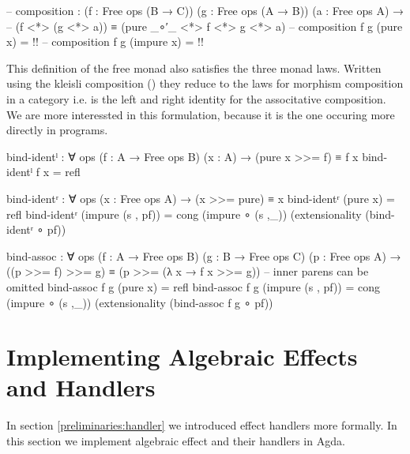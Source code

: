 \begin{code}[hide]
-- composition : (f : Free ops (B → C)) (g : Free ops (A → B)) (a : Free ops A) →
--    (f <*> (g <*> a)) ≡ (pure _∘′_ <*> f <*> g <*> a)
-- composition f g (pure x) = {!!}
-- composition f g (impure x) = {!!}
\end{code}
This definition of the free monad also satisfies the three monad laws.
Written using the kleisli composition (\AgdaFunction{>=>}) they reduce to the
laws for morphism composition in a category i.e.
 is the left and right identity for the
associtative composition.
We are more interessted in this formulation, because it is the one occuring more
directly in programs.

\begin{code}[number=bind-ident-left]
bind-identˡ : ∀ {ops} (f : A → Free ops B) (x : A) → (pure x >>= f) ≡ f x
bind-identˡ f x = refl
\end{code}
\begin{code}[number=bind-ident-right]
bind-identʳ : ∀ {ops} (x : Free ops A) → (x >>= pure) ≡ x
bind-identʳ (pure x)           = refl
bind-identʳ (impure (s , pf))  = cong (impure ∘ (s ,_)) (extensionality (bind-identʳ ∘ pf))
\end{code}
\begin{code}[number=bind-assoc]
bind-assoc : ∀ {ops} (f : A → Free ops B) (g : B → Free ops C) (p : Free ops A) →
  ((p >>= f) >>= g) ≡ (p >>= (λ x → f x >>= g)) -- inner parens can be omitted
bind-assoc f g (pure x)           = refl
bind-assoc f g (impure (s , pf))  = cong (impure ∘ (s ,_)) (extensionality (bind-assoc f g ∘ pf))
\end{code}


\section{Implementing Algebraic Effects and Handlers}
\label{first-order:effects-and-handlers}

In section \ref{preliminaries:handler} we introduced effect handlers more
formally.
In this section we implement algebraic effect and their handlers in Agda.

